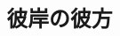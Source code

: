 \documentclass[autodetect-engine,dvipdfmx-if-dvi,a5paper,ja=standard,twoside,titlepage,final,twocolumn]{ltjtbook}
\begin{document}
    
\title{\tt \Huge 彼岸の彼方}
\author{}
\date{}
\maketitle


    
\end{document}
